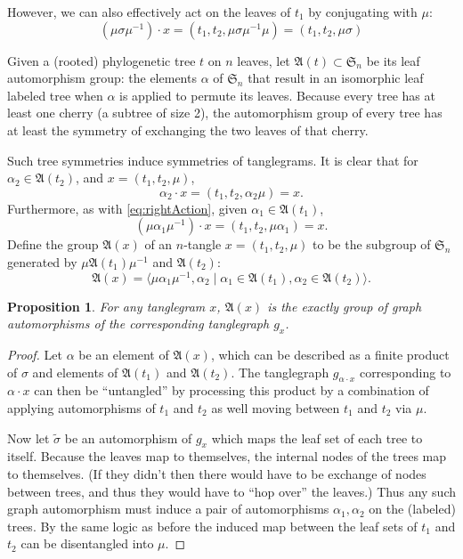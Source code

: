 \documentclass{amsart}
\newtheorem{proposition}{Proposition}
\newcommand{\fS}{\mathfrak S}
\newcommand{\aut}{\mathfrak A}
\newcommand{\pairing}{\mu}
\begin{document}
However, we can also effectively act on the leaves of $t_1$ by conjugating with $\pairing$:
\begin{equation}
\label{eq:rightAction}
(\pairing \sigma \pairing^{-1}) \cdot x
= (t_1, t_2, \pairing \sigma \pairing^{-1} \pairing)
= (t_1, t_2, \pairing \sigma)
\end{equation}

Given a (rooted) phylogenetic tree $t$ on $n$ leaves, let $\aut(t) \subset \fS_n$ be its leaf automorphism group: the elements $\alpha$ of $\fS_n$ that result in an isomorphic leaf labeled tree when $\alpha$ is applied to permute its leaves.
Because every tree has at least one cherry (a subtree of size 2), the automorphism group of every tree has at least the symmetry of exchanging the two leaves of that cherry.

Such tree symmetries induce symmetries of tanglegrams.
It is clear that for $\alpha_2 \in \aut(t_2)$, and $x = (t_1, t_2, \pairing)$,
\[
\alpha_2 \cdot x = (t_1, t_2, \alpha_2 \pairing) = x.
\]
Furthermore, as with \eqref{eq:rightAction}, given $\alpha_1 \in \aut(t_1)$,
\[
(\pairing \alpha_1 \pairing^{-1}) \cdot x = (t_1, t_2, \pairing \alpha_1) = x.
\]
Define the group $\aut(x)$ of an $n$-tangle $x = (t_1, t_2, \pairing)$ to be the subgroup of $\fS_n$ generated by $\pairing \aut(t_1) \pairing^{-1}$ and $\aut(t_2)$:
\[
\aut(x) = \langle \pairing \alpha_1 \pairing^{-1}, \alpha_2 \mid \alpha_1 \in \aut(t_1), \alpha_2 \in \aut(t_2) \rangle.
\]

\begin{proposition}
For any tanglegram $x$, $\aut(x)$ is the exactly group of graph automorphisms of the corresponding tanglegraph $g_x$.
\end{proposition}
\begin{proof}
Let $\alpha$ be an element of $\aut(x)$, which can be described as a finite product of $\sigma$ and elements of $\aut(t_1)$ and $\aut(t_2)$.
The tanglegraph $g_{\alpha \cdot x}$ corresponding to $\alpha \cdot x$ can then be ``untangled'' by processing this product by a combination of applying automorphisms of $t_1$ and $t_2$ as well moving between $t_1$ and $t_2$ via $\pairing$.

Now let $\tilde \sigma$ be an automorphism of $g_x$ which maps the leaf set of each tree to itself.
Because the leaves map to themselves, the internal nodes of the trees map to themselves.
(If they didn't then there would have to be exchange of nodes between trees, and thus they would have to ``hop over'' the leaves.)
Thus any such graph automorphism must induce a pair of automorphisms $\alpha_1, \alpha_2$ on the (labeled) trees.
By the same logic as before the induced map between the leaf sets of $t_1$ and $t_2$ can be disentangled into $\pairing$.
\end{proof}
\end{document}
